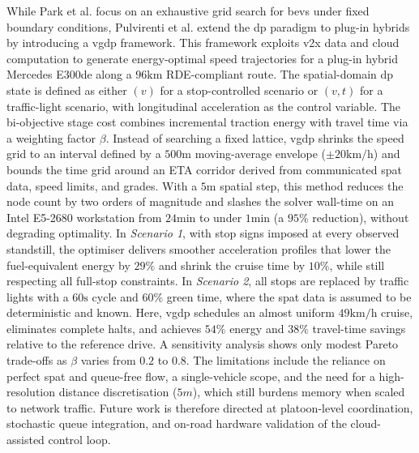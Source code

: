 \mynewline
While Park et al. focus on an exhaustive grid search for \acp{bev} under fixed boundary conditions, Pulvirenti et al. \cite{Pulvirenti2023} extend the \ac{dp} paradigm to plug-in hybrids by introducing a \ac{vgdp} framework. This framework exploits \ac{v2x} data and cloud computation to generate energy-optimal speed trajectories for a plug-in hybrid Mercedes E300de along a $96\unit{\kilo\metre}$ RDE-compliant route. The spatial-domain \ac{dp} state is defined as either $(v)$ for a stop-controlled scenario or $(v,t)$ for a traffic-light scenario, with longitudinal acceleration as the control variable. The bi-objective stage cost combines incremental traction energy with travel time via a weighting factor $\beta$. Instead of searching a fixed lattice, \ac{vgdp} shrinks the speed grid to an interval defined by a $500\unit{\metre}$ moving-average envelope ($\pm20\unit{\kilo\metre\per\hour}$) and bounds the time grid around an ETA corridor derived from communicated \ac{spat} data, speed limits, and grades. With a $5\unit{\metre}$ spatial step, this method reduces the node count by two orders of magnitude and slashes the solver wall-time on an Intel E5-2680 workstation from $24\unit{\minute}$ to under $1\unit{\minute}$ (a $95\%$ reduction), without degrading optimality. In \textit{Scenario 1}, with stop signs imposed at every observed standstill, the optimiser delivers smoother acceleration profiles that lower the fuel-equivalent energy by $29\%$ and shrink the cruise time by $10\%$, while still respecting all full-stop constraints. In \textit{Scenario 2}, all stops are replaced by traffic lights with a $60\unit{\second}$ cycle and $60\%$ green time, where the \ac{spat} data is assumed to be deterministic and known. Here, \ac{vgdp} schedules an almost uniform $49\unit{\kilo\metre\per\hour}$ cruise, eliminates complete halts, and achieves $54\%$ energy and $38\%$ travel-time savings relative to the reference drive. A sensitivity analysis shows only modest Pareto trade-offs as $\beta$ varies from $0.2$ to $0.8$. The limitations include the reliance on perfect \ac{spat} and queue-free flow, a single-vehicle scope, and the need for a high-resolution distance discretisation ($5\unit{m}$), which still burdens memory when scaled to network traffic. Future work is therefore directed at platoon-level coordination, stochastic queue integration, and on-road hardware validation of the cloud-assisted control loop.
\mynewline
